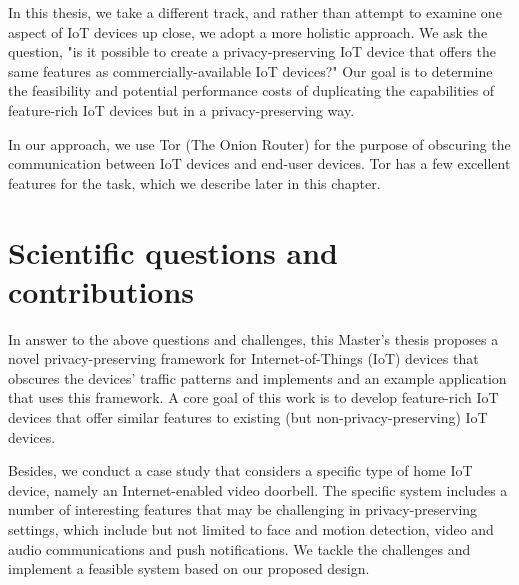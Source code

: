 In this thesis, we take a different track, and rather than attempt to examine one aspect of IoT devices up close, we adopt a more holistic approach. We ask the question, "is it possible to create a privacy-preserving IoT device that offers the same features as commercially-available IoT devices?" Our goal is to determine the feasibility and potential performance costs of duplicating the capabilities of feature-rich IoT devices but in a privacy-preserving way.

In our approach, we use Tor (The Onion Router) for the purpose of obscuring the communication between IoT devices and end-user devices. Tor has a few excellent features for the task, which we describe later in this chapter.

\section{Scientific questions and contributions}

In answer to the above questions and challenges, this Master's thesis proposes a novel privacy-preserving framework for Internet-of-Things (IoT) devices that obscures the devices' traffic patterns and implements and an example application that uses this framework. A core goal of this work is to develop feature-rich IoT devices that offer similar features to existing (but non-privacy-preserving) IoT devices.

Besides, we conduct a case study that considers a specific type of home IoT device, namely an Internet-enabled video doorbell. The specific system includes a number of interesting features that may be challenging in privacy-preserving settings, which include but not limited to face and motion detection, video and audio communications and push notifications. We tackle the challenges and implement a feasible system based on our proposed design.



